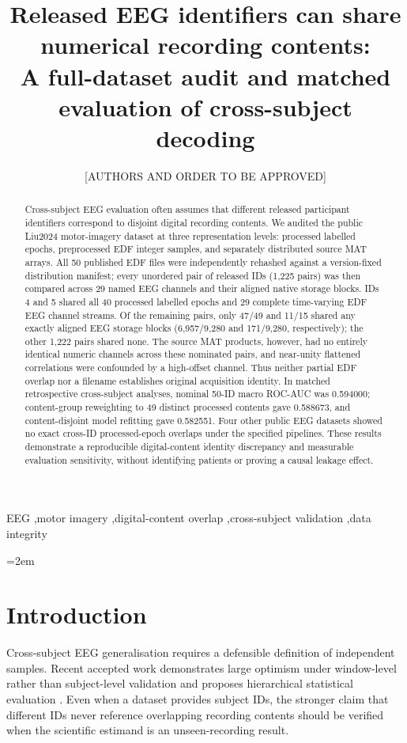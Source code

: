 \documentclass[preprint,12pt]{elsarticle}
\begin{document}
\begin{frontmatter}
\title{Released EEG identifiers can share numerical recording contents:\\
A full-dataset audit and matched evaluation of cross-subject decoding}
\author[aff1]{[AUTHORS AND ORDER TO BE APPROVED]}
\address[aff1]{[AFFILIATION(S) AND CORRESPONDING AUTHOR TO BE APPROVED]}
\begin{abstract}
Cross-subject EEG evaluation often assumes that different released
participant identifiers correspond to disjoint digital recording
contents. We audited the public Liu2024 motor-imagery dataset at
three representation levels: processed labelled epochs, preprocessed
EDF integer samples, and separately distributed source MAT arrays.
All 50 published EDF files were independently rehashed against a
version-fixed distribution manifest; every unordered pair of
released IDs (1,225 pairs) was then compared across 29 named EEG
channels and their aligned native storage blocks. IDs 4 and 5
shared all 40 processed labelled epochs and 29 complete
time-varying EDF EEG channel streams. Of the remaining pairs,
only 47/49 and 11/15 shared any exactly aligned EEG storage
blocks (6,957/9,280 and 171/9,280, respectively); the other
1,222 pairs shared none. The source MAT products, however, had
no entirely identical numeric channels across these nominated
pairs, and near-unity flattened correlations were confounded by
a high-offset channel. Thus neither partial EDF overlap nor a
filename establishes original acquisition identity. In matched
retrospective cross-subject analyses, nominal 50-ID macro ROC-AUC
was 0.594000; content-group reweighting to 49 distinct processed
contents gave 0.588673, and content-disjoint model refitting
gave 0.582551. Four other public EEG datasets showed no exact
cross-ID processed-epoch overlaps under the specified pipelines.
These results demonstrate a reproducible digital-content identity
discrepancy and measurable evaluation sensitivity, without
identifying patients or proving a causal leakage effect.
\end{abstract}
\begin{keyword}
EEG \sep motor imagery \sep digital-content overlap \sep cross-subject validation \sep data integrity
\end{keyword}
\end{frontmatter}
\emergencystretch=2em
\section{Introduction}
Cross-subject EEG generalisation requires a defensible definition of
independent samples. Recent accepted work demonstrates large optimism
under window-level rather than subject-level validation and proposes
hierarchical statistical evaluation \cite{gil2026subjectvalidation}.
Even when a dataset provides subject IDs, the stronger claim that
different IDs never reference overlapping recording contents should be
verified when the scientific estimand is an unseen-recording result.
\end{document}
